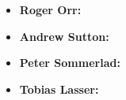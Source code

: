 \begin{itemize}
    \item{\textbf{Roger Orr:}}
    \item{\textbf{Andrew Sutton:}}
    \item{\textbf{Peter Sommerlad:}}
    \item{\textbf{Tobias Lasser:}}
\end{itemize}
